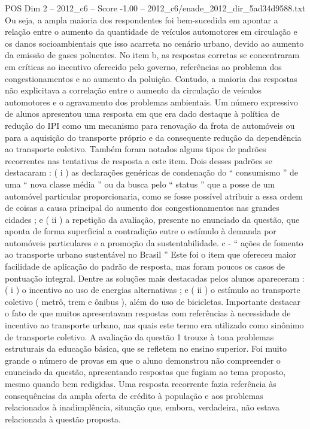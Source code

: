 \begin{textsample}{POS Dim 2 – 2012\_c6 – Score -1.00 – 2012\_c6/enade\_2012\_dir\_5ad34d9588.txt}
Ou seja, a ampla maioria dos respondentes foi bem-sucedida em apontar a relação entre o aumento da quantidade de veículos automotores em circulação e os danos socioambientais que isso acarreta no cenário urbano, devido ao aumento da emissão de gases poluentes.
No item b, as respostas corretas se concentraram em críticas ao incentivo oferecido pelo governo, referências ao problema dos congestionamentos e ao aumento da poluição.
Contudo, a maioria das respostas não explicitava a correlação entre o aumento da circulação de veículos automotores e o agravamento dos problemas ambientais.
Um número expressivo de alunos apresentou uma resposta em que era dado destaque à política de redução do IPI como um mecanismo para renovação da frota de automóveis ou para a aquisição do transporte próprio e da consequente redução da dependência ao transporte coletivo.
Também foram notados alguns tipos de padrões recorrentes nas tentativas de resposta a este item.
Dois desses padrões se destacaram : ( i ) as declarações genéricas de condenação do “ consumismo ” de uma “ nova classe média ” ou da busca pelo “ status ” que a posse de um automóvel particular proporcionaria, como se fosse possível atribuir a essa ordem de coisas a causa principal do aumento dos congestionamentos nas grandes cidades ; e ( ii ) a repetição da avaliação, presente no enunciado da questão, que aponta de forma superficial a contradição entre o estímulo à demanda por automóveis particulares e a promoção da sustentabilidade. c - “ ações de fomento ao transporte urbano sustentável no Brasil ” Este foi o item que ofereceu maior facilidade de aplicação do padrão de resposta, mas foram poucos os casos de pontuação integral.
Dentre as soluções mais destacadas pelos alunos apareceram : ( i ) o incentivo ao uso de energias alternativas ; e ( ii ) o estímulo ao transporte coletivo ( metrô, trem e ônibus ), além do uso de bicicletas.
Importante destacar o fato de que muitos apresentavam respostas com referências à necessidade de incentivo ao transporte urbano, nas quais este termo era utilizado como sinônimo de transporte coletivo.
A avaliação da questão 1 trouxe à tona problemas estruturais da educação básica, que se refletem no ensino superior.
Foi muito grande o número de provas em que o aluno demonstrou não compreender o enunciado da questão, apresentando respostas que fugiam ao tema proposto, mesmo quando bem redigidas.
Uma resposta recorrente fazia referência às consequências da ampla oferta de crédito à população e aos problemas relacionados à inadimplência, situação que, embora, verdadeira, não estava relacionada à questão proposta.

\end{textsample}
